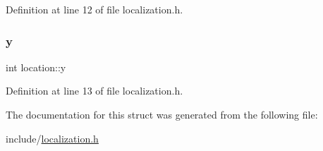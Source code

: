 Definition at line 12 of file localization.\+h.

\mbox{\label{structlocation_ad7197d1981d4ea5d8b36041473cac815}} 
\subsubsection{\texorpdfstring{y}{y}}
{\footnotesize\ttfamily int location\+::y}



Definition at line 13 of file localization.\+h.



The documentation for this struct was generated from the following file\+:\begin{DoxyCompactItemize}
\item 
include/\hyperlink{localization_8h}{localization.\+h}\end{DoxyCompactItemize}
